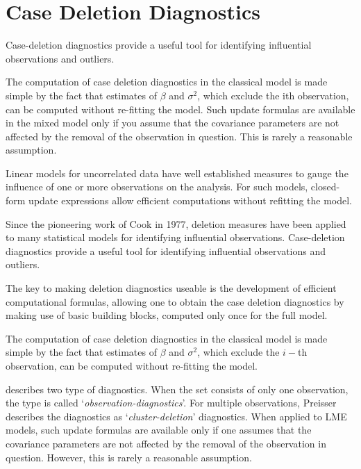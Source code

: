 \documentclass[Main.tex]{subfiles}
\begin{document}
\section{Case Deletion Diagnostics}
Case-deletion diagnostics provide a useful tool for identifying influential observations and outliers.

The computation of case deletion diagnostics in the classical model is made simple by the fact that estimates of $\beta$ and $\sigma^2$, which exclude the ith observation, can be computed without re-fitting the model. Such update formulas are available in the mixed model only if you assume that the covariance parameters are not affected by the removal of the observation in question. This is rarely a reasonable assumption.

Linear models for uncorrelated data have well established measures to gauge the influence of one or more
observations on the analysis. For such models, closed-form update expressions allow efficient computations
without refitting the model. 


Since the pioneering work of Cook in 1977, deletion measures have been applied to many statistical models for identifying influential observations. Case-deletion diagnostics provide a useful tool for identifying influential observations and outliers.

The key to making deletion diagnostics useable is the development of efficient computational formulas, allowing one to obtain the  case deletion diagnostics by making use of basic building blocks, computed only once for the full model.

The computation of case deletion diagnostics in the classical model is made simple by the fact that estimates of $\beta$ and $\sigma^2$, which exclude the $i-$th observation, can be computed without re-fitting the model. %

\citet{preisser} describes two type of diagnostics. When the set consists of only one observation, the type is called
`\textit{observation-diagnostics}'. For multiple observations, Preisser describes the diagnostics as `\textit{cluster-deletion}' diagnostics. When applied to LME models, such update formulas are available only if one assumes that the covariance parameters are not affected by the removal of the observation in question. However, this is rarely a reasonable assumption.
\end{document}

